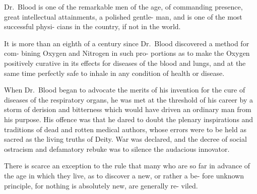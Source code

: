 \documentclass[10pt]{article}
\begin{document}
\begin{multicols}{3}
Dr.~Blood is one of the remarkable men\linebreak
of the age, of commanding presence, great\linebreak
intellectual attainments, a polished gentle-\linebreak
man, and is one of the most successful physi-\linebreak
cians in the country, if not in the world.

It is more than an eighth of a century\linebreak
since Dr.~Blood discovered a method for com-\linebreak
bining Oxygen and Nitrogen in such pro-\linebreak
portions as to make the Oxygen positively curative in its effects for diseases\linebreak
of the blood and lungs, and at the same time perfectly safe to inhale in any\linebreak
condition of health or disease.

When Dr.~Blood began to advocate the merits of his invention for the\linebreak
cure of diseases of the respiratory organs, he was met at the threshold of his\linebreak
career by a storm of derision and bitterness which would have driven an\linebreak
ordinary man from his purpose. His offence was that he dared to doubt\linebreak
the plenary inspirations and traditions of dead and rotten medical authors,\linebreak
whose errors were to be held as sacred as the living truths of Deity. War\linebreak
was declared, and the decree of social ostracism and defamatory rebuke was\linebreak
to silence the audacious innovator.\columnbreak

There is scarce an exception to the rule that many who are so far in\linebreak
advance of the age in which they live, as to discover a new, or rather a be-\linebreak
fore unknown principle, for nothing is absolutely new, are generally re-\linebreak
viled.


\end{multicols}
\end{document}

